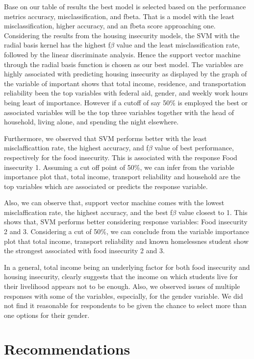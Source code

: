 \documentclass[
  10pt,
]{article}
\begin{document}
Base on our table of results the best model is selected based on the performance metrics accuracy, misclassification, and fbeta. That is a model with the least misclassification, higher accuracy, and an fbeta score approaching one. Considering the results from the housing insecurity models, the SVM with the radial basis kernel has the highest f\(\beta\) value and the least misclassification rate, followed by the linear discriminate analysis. Hence the support vector machine through the radial basis function is chosen as our best model. The variables are highly associated with predicting housing insecurity as displayed by the graph of the variable of important shows that total income, residence, and transportation reliability been the top variables with federal aid, gender, and weekly work hours being least of importance. However if a cutoff of say 50\% is employed the best or associated variables will be the top three variables together with the head of household, living alone, and spending the night elsewhere.

Furthermore, we observed that SVM performs better with the least misclafficattion rate, the highest accuracy, and f\(\beta\) value of best performance, respectively for the food insecurity. This is associated with the response Food insecurity 1. Assuming a cut off point of 50\%, we can infer from the variable importance plot that, total income, transport reliability and household are the top variables which are associated or predicts the response variable.

Also, we can observe that, support vector machine comes with the lowest misclaffication rate, the highest accuracy, and the best f\(\beta\) value closest to 1. This shows that, SVM performs better considering response variables: Food insecurity 2 and 3. Considering a cut of 50\%, we can conclude from the variable importance plot that total income, transport reliability and known homelessnes student show the strongest associated with food insecurity 2 and 3.

In a general, total income being an underlying factor for both food insecurity and housing insecurity, clearly suggests that the income on which students live for their livelihood appears not to be enough. Also, we observed issues of multiple responses with some of the variables, especially, for the gender variable. We did not find it reasonable for respondents to be given the chance to select more than one options for their gender.

\hypertarget{recommendations}{%
\section{Recommendations}\label{recommendations}}
\end{document}

